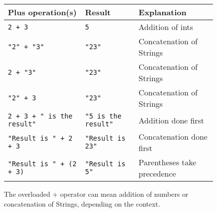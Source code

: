 






\begin {figure}

\begin {tabular} {l | l | l}
Plus operation(s)	& 	Result 	& 	Explanation			\\
\hline
\texttt{2 + 3}		& 	\texttt{5}	&	Addition of ints   		\\
\texttt{"2" + "3"}	& 	\texttt{"23"}	&	Concatenation of Strings	\\
\texttt{2 + "3"}	& 	\texttt{"23"}	&	Concatenation of Strings	\\
\texttt{"2" + 3}	& 	\texttt{"23"}	&	Concatenation of Strings	\\
\texttt{2 + 3 + " is the result"} & \texttt{"5 is the result"} & 
			Addition done first	\\
\texttt{"Result is " + 2 + 3}	& \texttt{"Result is 23"}	&	
			Concatenation done first					\\
\texttt{"Result is " + (2 + 3)}	& \texttt{"Result is 5"} &	
			Parentheses take precedence

\end {tabular}

\caption {The overloaded + operator can mean addition of numbers or
concatenation of Strings, depending on the context. }

\label {fig:overloadedPlus}

\end {figure}


